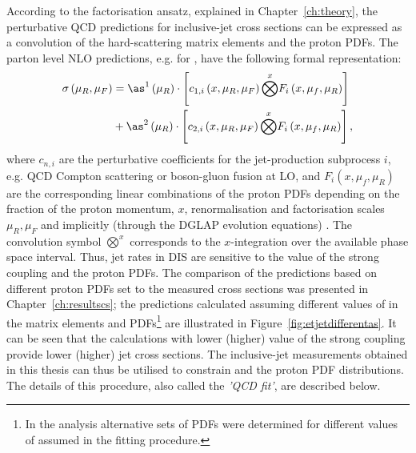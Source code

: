 According to the factorisation ansatz, explained in Chapter~\ref{ch:theory}, the perturbative QCD predictions for inclusive-jet cross sections can be expressed as a convolution of the hard-scattering matrix elements and the proton PDFs. The parton level NLO predictions, e.g. for \dsdetjetb, have the following formal representation:
\begin{equation}
	\begin{split}
\sigma\left( \mu_R, \mu_F\right)  &= \as^1\left( \mu_R\right) \cdot \left[ c_{1,i}\left( x, \mu_R, \mu_F\right) \overset{x}{\bigotimes } F_i\left( x, \mu_f, \mu_R \right) \right] \\
&+ \as^2\left( \mu_R\right) \cdot \left[ c_{2,i}\left( x, \mu_R, \mu_F\right) \overset{x}{\bigotimes } F_i\left( x, \mu_f, \mu_R \right) \right],
	\end{split}
	\label{eq:fitnloqcdpredictions}
\end{equation}
where $c_{n,i}$ are the perturbative coefficients for the jet-production subprocess $i$, e.g. QCD Compton scattering or boson-gluon fusion at LO, and $F_i\left( x, \mu_f, \mu_R \right)$ are the corresponding linear combinations of the proton PDFs depending on the fraction of the proton momentum, $x$, renormalisation and factorisation scales $\mu_R, \mu_F$ and implicitly (through the DGLAP evolution equations) \as. The convolution symbol $\overset{x}{\bigotimes}$ corresponds to the $x$-integration over the available phase space interval. Thus, jet rates in DIS are sensitive to the value of the strong coupling and the proton PDFs. The comparison of the predictions based on different proton PDFs set to the measured cross sections was presented in Chapter~\ref{ch:resultscs}; the predictions calculated assuming different values of \asz in the matrix elements and PDFs\footnote{In the  analysis alternative sets of PDFs were determined for different values of \asz assumed in the fitting procedure.} are illustrated in Figure~\ref{fig:etjetdifferentas}. It can be seen that the calculations with lower (higher) value of the strong coupling provide lower (higher) jet cross sections. %
The inclusive-jet measurements obtained in this thesis can thus be utilised to constrain \as and the proton PDF distributions. The details of this procedure, also called the \emph{'QCD fit'}, are described below.



